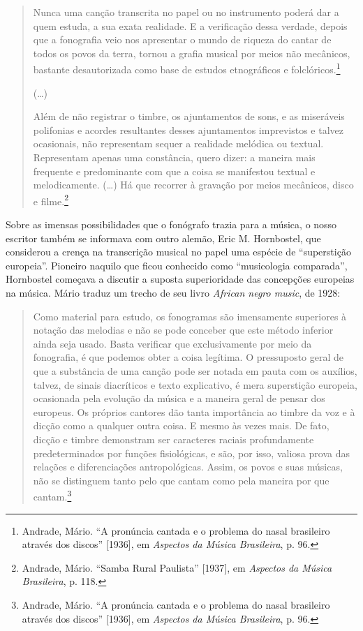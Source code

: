 \begin{quote}
Nunca uma canção transcrita no papel ou no instrumento poderá dar a quem
estuda, a sua exata realidade. E a verificação dessa verdade, depois que
a fonografia veio nos apresentar o mundo de riqueza do cantar de todos
os povos da terra, tornou a grafia musical por meios não mecânicos,
bastante desautorizada como base de estudos etnográficos e
folclóricos.\footnote{Andrade, Mário. ``A pronúncia cantada e o problema
  do nasal brasileiro através dos discos'' {[}1936{]}, em \emph{Aspectos
  da Música Brasileira}, p. 96.}

(\ldots{})

Além de não registrar o timbre, os ajuntamentos de sons, e as miseráveis
polifonias e acordes resultantes desses ajuntamentos imprevistos e
talvez ocasionais, não representam sequer a realidade melódica ou
textual. Representam apenas uma constância, quero dizer: a maneira mais
frequente e predominante com que a coisa se manifestou textual e
melodicamente. (\ldots{}) Há que recorrer à gravação por meios mecânicos,
disco e filme.\footnote{Andrade, Mário. ``Samba Rural Paulista''
  {[}1937{]}, em \emph{Aspectos da Música Brasileira}, p. 118.}
\end{quote}

Sobre as imensas possibilidades que o fonógrafo trazia para a música, o
nosso escritor também se informava com outro alemão, Eric M. Hornbostel,
que considerou a crença na transcrição musical no papel uma espécie de
``superstição europeia''. Pioneiro naquilo que ficou conhecido como
``musicologia comparada'', Hornbostel começava a discutir a suposta
superioridade das concepções europeias na música. Mário traduz um trecho
de seu livro \emph{African negro music}, de 1928:

\begin{quote}
Como material para estudo, os fonogramas são imensamente superiores à
notação das melodias e não se pode conceber que este método inferior
ainda seja usado. Basta verificar que exclusivamente por meio da
fonografia, é que podemos obter a coisa legítima. O pressuposto geral de
que a substância de uma canção pode ser notada em pauta com os auxílios,
talvez, de sinais diacríticos e texto explicativo, é mera superstição
europeia, ocasionada pela evolução da música e a maneira geral de pensar
dos europeus. Os próprios cantores dão tanta importância ao timbre da
voz e à dicção como a qualquer outra coisa. E mesmo às vezes mais. De
fato, dicção e timbre demonstram ser caracteres raciais profundamente
predeterminados por funções fisiológicas, e são, por isso, valiosa prova
das relações e diferenciações antropológicas. Assim, os povos e suas
músicas, não se distinguem tanto pelo que cantam como pela maneira por
que cantam.\footnote{Andrade, Mário. ``A pronúncia cantada e o problema
  do nasal brasileiro através dos discos'' {[}1936{]}, em \emph{Aspectos
  da Música Brasileira}, p. 96.}
\end{quote}

